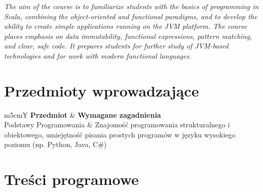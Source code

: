 \documentclass[12pt, a4paper]{article}
\newcommand{\thdrule}{\noalign{\global\setlength{\extrarowheight}{0pt}}}
\newcommand{\thdend}{\noalign{\global\setlength{\extrarowheight}{3pt}}}
\begin{document}
\textit{The aim of the course is to familiarize students with the basics of programming in Scala, combining the object-oriented and functional paradigms, and to develop the ability to create simple applications running on the JVM platform. The course places emphasis on data immutability, functional expressions, pattern matching, and clear, safe code. It prepares students for further study of JVM-based technologies and for work with modern functional languages.}


\section{Przedmioty wprowadzające}

{\scriptsize
\begin{tabularx}{\textwidth}{m{5cm}Y}
\thdrule\toprule
{} {\color{white}\textbf{Przedmiot}} & {\color{white}\textbf{Wymagane zagadnienia}} \\
\midrule\thdend
   Podstawy Programowania & Znajomość programowania strukturalnego i obiektowego, umiejętność pisania prostych programów w języku wysokiego poziomu (np. Python, Java, C\#) \\
\bottomrule
\end{tabularx}}

\section{Treści programowe}
\end{document}
